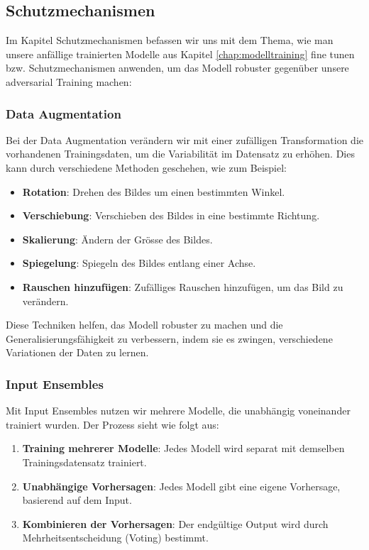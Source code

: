 \subsection{Schutzmechanismen}

Im Kapitel Schutzmechanismen befassen wir uns mit dem Thema, wie man unsere anfällige trainierten Modelle aus Kapitel \ref{chap:modelltraining} fine tunen bzw. Schutzmechanismen anwenden, um das Modell robuster gegenüber unsere adversarial Training machen:

\subsubsection{Data Augmentation}

Bei der Data Augmentation verändern wir mit einer zufälligen Transformation die vorhandenen Trainingsdaten, um die Variabilität im Datensatz zu erhöhen. Dies kann durch verschiedene Methoden geschehen, wie zum Beispiel:

\begin{itemize}
    \item \textbf{Rotation}: Drehen des Bildes um einen bestimmten Winkel.
    \item \textbf{Verschiebung}: Verschieben des Bildes in eine bestimmte Richtung.
    \item \textbf{Skalierung}: Ändern der Grösse des Bildes.
    \item \textbf{Spiegelung}: Spiegeln des Bildes entlang einer Achse.
    \item \textbf{Rauschen hinzufügen}: Zufälliges Rauschen hinzufügen, um das Bild zu verändern.
\end{itemize}

Diese Techniken helfen, das Modell robuster zu machen und die Generalisierungsfähigkeit zu verbessern, indem sie es zwingen, verschiedene Variationen der Daten zu lernen.

\subsubsection{Input Ensembles}

Mit Input Ensembles nutzen wir mehrere Modelle, die unabhängig voneinander trainiert wurden. Der Prozess sieht wie folgt aus:

\begin{enumerate}
    \item \textbf{Training mehrerer Modelle}: Jedes Modell wird separat mit demselben Trainingsdatensatz trainiert.
    \item \textbf{Unabhängige Vorhersagen}: Jedes Modell gibt eine eigene Vorhersage, basierend auf dem Input.
    \item \textbf{Kombinieren der Vorhersagen}: Der endgültige Output wird durch Mehrheitsentscheidung (Voting) bestimmt. 
\end{enumerate}

